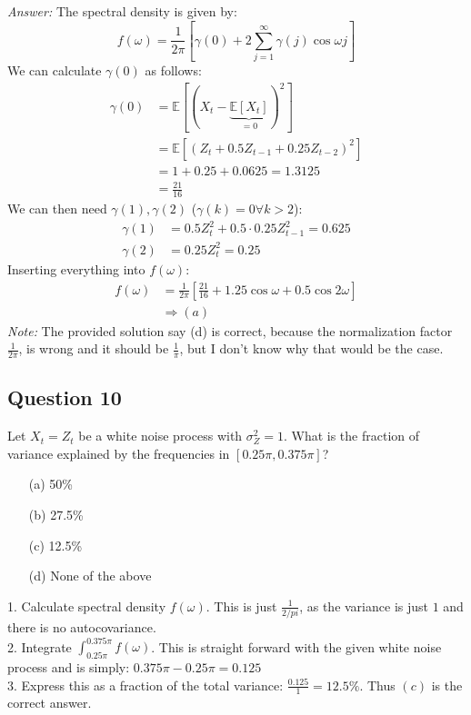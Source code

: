 \begin{footnotesize}
    \textit{Answer:} The spectral density is given by:\[
    f(\omega)= \frac{1}{2\pi}\left[\gamma(0) + 2 \sum_{j=1}^\infty \gamma(j) \cos{\omega j} \right]
    \]
    We can calculate $\gamma(0)$ as follows:
    \begin{align*}
        \gamma(0)&=\mathbb{E}[(X_t- \underbrace{\mathbb{E}[X_t]}_{=0})^2] \\
        &= \mathbb{E}[(Z_t + 0.5Z_{t-1} + 0.25Z_{t-2})^2] \\
        &= 1 + 0.25 + 0.0625 = 1.3125 \\
        &= \frac{21}{16}
    \end{align*}
    We can then need $\gamma(1), \gamma(2)$ ($\gamma(k)=0 \forall k>2$):
    \begin{align*}
        \gamma(1) &= 0.5Z_t^2 + 0.5\cdot0.25 Z_{t-1}^2 = 0.625\\
        \gamma(2)&= 0.25Z_t^2 = 0.25
    \end{align*}
    Inserting everything into $f(\omega)$:
    \begin{align*}
        f(\omega)&=\frac{1}{2\pi} \left[\frac{21}{16} + 1.25 \cos{\omega} + 0.5\cos{2\omega} \right] \\
        &\Rightarrow (a)
    \end{align*}
    \textit{Note:} The provided solution say (d) is correct, because the normalization factor $\frac{1}{2\pi}$, is wrong and it should be $\frac{1}{\pi}$, but I don't know why that would be the case.  
\end{footnotesize}

\subsection*{Question 10}

Let $X_t = Z_t$ be a white noise process with $\sigma_Z^2=1$. What is the fraction of variance explained by the frequencies in $[0.25\pi, 0.375\pi]$?

\begin{itemize}
    \item[(a)] 50\%
    \item[(b)] 27.5\%
    \item[(c)] 12.5\%
    \item[(d)] None of the above
\end{itemize}

\begin{footnotesize}
    1. Calculate spectral density $f(\omega)$. This is just $\frac{1}{2/pi}$, as the variance is just $1$ and there is no autocovariance.\\
    2. Integrate $\int_{0.25\pi}^{0.375\pi} f(\omega)$. This is straight forward with the given white noise process and is simply: $0.375\pi-0.25\pi=0.125$\\
    3. Express this as a fraction of the total variance: $\frac{0.125}{1}= 12.5\%$. Thus $(c)$ is the correct answer.
\end{footnotesize}

